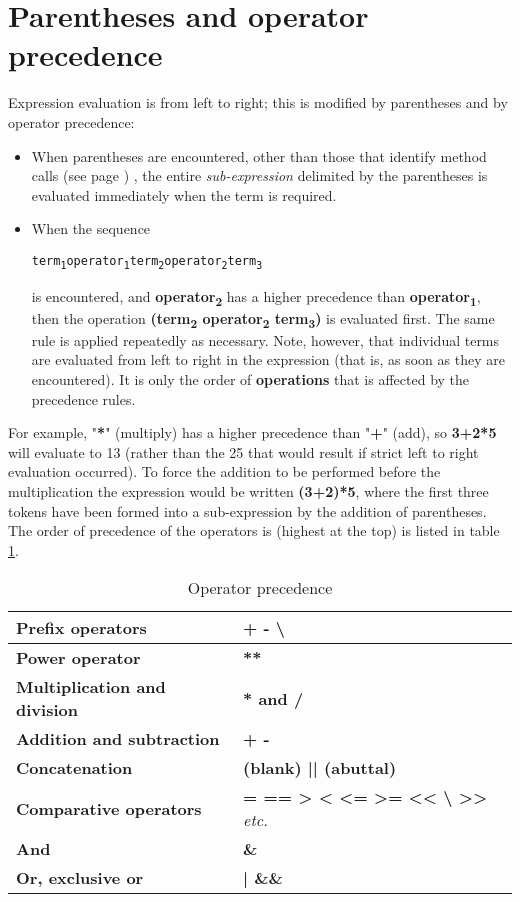 \section{Parentheses and operator precedence}\label{refpreced}
 Expression evaluation is from left to right; this is modified by
parentheses and by operator precedence:
\begin{itemize}
\item 
When parentheses are encountered, other than those that identify
 method calls (see page \pageref{refmethcon}) , the entire \emph{sub-expression}
delimited by the parentheses is evaluated immediately when the term is
required.
\item When the sequence
\begin{alltt}
term\textsubscript{1} operator\textsubscript{1} term\textsubscript{2} operator\textsubscript{2} term\textsubscript{3}
\end{alltt}
is encountered, and \textbf{operator\textsubscript{2}} has a higher
precedence than \textbf{operator\textsubscript{1}}, then the
operation \textbf{(term\textsubscript{2} operator\textsubscript{2} term\textsubscript{3})} is evaluated
first.
The same rule is applied repeatedly as necessary.
 Note, however, that individual terms are evaluated from left to
right in the expression (that is, as soon as they are encountered).  It
is only the order of \textbf{operations} that is affected by the
precedence rules.
\end{itemize}
For example, "\textbf{*}" (multiply) has a higher precedence
than "\textbf{+}" (add), so \textbf{3+2*5} will evaluate to
13 (rather than the 25 that would result if strict left to right
evaluation occurred).
To force the addition to be performed before the multiplication the
expression would be written \textbf{(3+2)*5}, where the first three
tokens have been formed into a sub-expression by the addition of
parentheses.
 The order of precedence of the operators is (highest at the top) is
 listed in table \ref{table:Operator Precedence}.
\begin{table}\caption{Operator precedence}\label{table:Operator Precedence}
\begin{tabularx}{\textwidth}{>{\bfseries}lX}
\toprule
Prefix operators&\textbf{+  -  \textbackslash }
\\\midrule
Power operator&\textbf{**}
\\\midrule
Multiplication and division&\textbf{* and /}
\\\midrule
Addition and subtraction&\textbf{+  -}
\\\midrule
Concatenation&\textbf{(blank)  ||  (abuttal)}
\\\midrule
Comparative operators&\textbf{=  ==  >  <  <= >=  <{}<  \textbackslash
  >{}> } \emph{etc.}
\\\midrule
And&\textbf{\&}
\\\midrule
Or, exclusive or&\textbf{|  \&\&}
\\\bottomrule
\end{tabularx}
\end{table}

